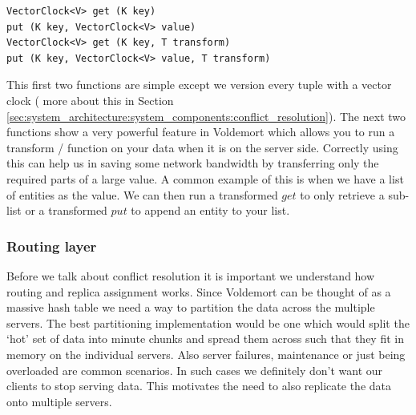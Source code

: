 \documentclass[10pt,twocolumn,preprint,natbib,authoryear]{sigplanconf}
\begin{document}
\scriptsize
\begin{verbatim}
VectorClock<V> get (K key)
put (K key, VectorClock<V> value)
VectorClock<V> get (K key, T transform)
put (K key, VectorClock<V> value, T transform)
\end{verbatim}
\normalsize

This first two functions are simple except we version every tuple with a vector clock ( more about this in Section \ref{sec:system_architecture:system_components:conflict_resolution}). The next two functions show a very powerful feature in Voldemort which allows you to run a transform / function on your data when it is on the server side. Correctly using this can help us in saving some network bandwidth by transferring only the required parts of a large value. A common example of this is when we have a list of entities as the value. We can then run a transformed $get$ to only retrieve a sub-list or a transformed $put$ to append an entity to your list. 


\subsubsection {Routing layer }  
\label{sec:system_architecture:system_components:routing_layer}

Before we talk about conflict resolution it is important we understand how routing and replica assignment works. Since Voldemort can be thought of as a massive hash table we need a way to partition the data across the multiple servers. The best partitioning implementation would be one which would split the `hot' set of data into minute chunks and spread them across such that they fit in memory on the individual servers. Also server failures, maintenance or just being overloaded are common scenarios. In such cases we definitely don't want our clients to stop serving data. This motivates the need to also replicate the data onto multiple servers. 
\end{document}
